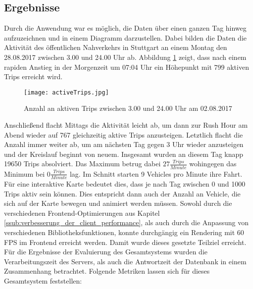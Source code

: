 \subsection{Ergebnisse}
\label{sub:ergebnisse}
  Durch die Anwendung war es möglich, die Daten über einen ganzen Tag hinweg aufzuzeichnen und in einem Diagramm darzustellen. Dabei bilden die Daten die Aktivität des öffentlichen Nahverkehrs in Stuttgart an einem Montag den 28.08.2017 zwischen 3.00 und 24.00 Uhr ab. Abbildung \ref{fig:activeTrips} zeigt, dass nach einem rapiden Anstieg in der Morgenzeit um 07:04 Uhr ein Höhepunkt mit 799 aktiven Trips erreicht wird.

  \begin{figure}[ht]
    \begin{center}
      \texttt{[image: activeTrips.jpg]}
      \caption{Anzahl an aktiven Trips zwischen 3.00 und 24.00 Uhr am 02.08.2017}
      \label{fig:activeTrips}
    \end{center}
  \end{figure}

  Anschließend flacht Mittags die Aktivität leicht ab, um dann zur Rush Hour am Abend wieder auf 767 gleichzeitig aktive Trips anzusteigen. Letztlich flacht die Anzahl immer weiter ab, um am nächsten Tag gegen 3 Uhr wieder anzusteigen und der Kreislauf beginnt von neuem. Insgesamt wurden an diesem Tag knapp 19650 Trips absolviert. Das Maximum betrug dabei $27 \frac{Trips}{Minute}$ wohingegen das Minimum bei $0 \frac{Trips}{Minute}$ lag. Im Schnitt starten 9 Vehicles pro Minute ihre Fahrt. Für eine interaktive Karte bedeutet dies, dass je nach Tag zwischen 0 und 1000 Trips aktiv sein können. Dies entspricht dann auch der Anzahl an Vehicle, die sich auf der Karte bewegen und animiert werden müssen. Sowohl durch die verschiedenen Frontend-Optimierungen aus Kapitel \ref{ssub:verbesserung_der_client_performance}, als auch durch die Anpassung von verschiedenen Bibliotheksfunktionen, konnte durchgängig ein Rendering mit 60 FPS im Frontend erreicht werden. Damit wurde dieses gesetzte Teilziel erreicht.\\

  Für die Ergebnisse der Evaluierung des Gesamtsystems wurden die Verarbeitungszeit des Servers, als auch die Antwortzeit der Datenbank in einem Zusammenhang betrachtet. Folgende Metriken lassen sich für dieses Gesamtsystem feststellen:


